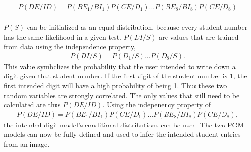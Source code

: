 \begin{align}
P(DE/ID) = P(BE_1/BI_1)P(CE/D_1)...P(BE_8/BI_8)P(CE/D_8)\\
\label{eqn:stdEqn4}
\end{align}

$P(S)$ can be initialized as an equal distribution, because every student number has the same likelihood in a given test. $P(DI/S)$ are values that are trained from data using the independence property, 
\begin{align}
P(DI/S) = P(D_1/S)...P(D_8/S).
\label{eqn:stdEqn4}
\end{align}
This value symbolizes the probability that the user intended to write down a digit given that student number. If the first digit of the student number is 1, the first intended digit will have a high probability of being 1. Thus these two random variables are strongly correlated. The only values that still need to be calculated are thus $P(DE/ID)$. Using the indepenency property of \begin{align}
P(DE/ID) = P(BE_1/BI_1)P(CE/D_1)...P(BE_8/BI_8)P(CE/D_8),
\label{eqn:stdEqn4}
\end{align}
the intended digit model's conditional distributions can be used. The two PGM models can now be fully defined and used to infer the intended student entries from an image.